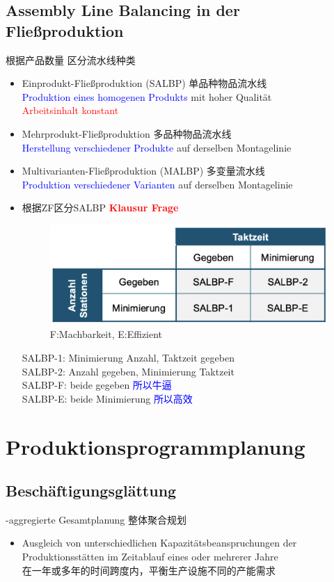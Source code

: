 \documentclass[12pt, letterpaper]{article}
\begin{document}
\begin{CJK*}{UTF8}{gbsn}
\subsection{Assembly Line Balancing in der Fließproduktion}
根据产品数量 区分流水线种类
\begin{itemize}
\item Einprodukt-Fließproduktion (SALBP) 单品种物品流水线\\[1mm]
\textcolor{blue}{Produktion eines homogenen Produkts} mit hoher Qualität\\[1mm]
\textcolor{red}{Arbeitsinhalt konstant}

\item Mehrprodukt-Fließproduktion 多品种物品流水线\\[1mm]
\textcolor{blue}{Herstellung verschiedener Produkte} auf derselben Montagelinie

\item Multivarianten-Fließproduktion (MALBP) 多变量流水线\\[1mm]
\textcolor{blue}{Produktion verschiedener Varianten} auf derselben Montagelinie\\

\item 根据ZF区分SALBP \textbf{\textcolor{red}{Klausur Frage}}\\[1mm]
\begin{figure}[h!]
  \centering %
  \includegraphics[width=0.4\linewidth]{VL51.png}
  \caption*{F:Machbarkeit, E:Effizient} %
\end{figure}
 
SALBP-1: Minimierung Anzahl, Taktzeit gegeben\\[1mm]
SALBP-2: Anzahl gegeben, Minimierung Taktzeit\\[1mm]
SALBP-F: beide gegeben \textcolor{blue}{所以牛逼}\\[1mm]
SALBP-E: beide Minimierung \textcolor{blue}{所以高效}

\end{itemize}


\newpage
\section{Produktionsprogrammplanung}
\subsection{Beschäftigungsglättung}
-aggregierte Gesamtplanung 整体聚合规划\\[1mm]
\begin{itemize}
\item Ausgleich von unterschiedlichen Kapazitätsbeanspruchungen der Produktionsstätten im Zeitablauf eines oder mehrerer
Jahre\\[1mm]
在一年或多年的时间跨度内，平衡生产设施不同的产能需求
\end{itemize}


\end{CJK*}
\end{document}
